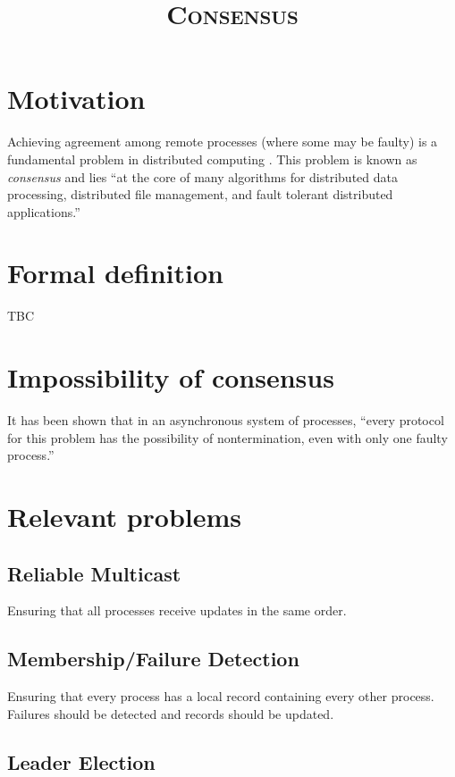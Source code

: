 \documentclass[12pt, a4paper]{article}
\title{\textsc{Consensus}}
\author{}
\date{}
\begin{document}
\maketitle


\section{Motivation}

Achieving agreement among remote processes (where some may be faulty) is a
fundamental problem in distributed computing \cite{fischer1985impossibility}.
This problem is known as \textit{consensus} and lies ``at the core of many
algorithms for distributed data processing, distributed file management, and
fault tolerant distributed applications.'' \cite{fischer1985impossibility}


\section{Formal definition}
TBC


\section{Impossibility of consensus}

It has been shown that in an asynchronous system of processes, ``every protocol
for this problem has the possibility of nontermination, even with only one
faulty process.'' \cite{fischer1985impossibility}


\section{Relevant problems}

\subsection{Reliable Multicast}

Ensuring that all processes receive updates in the same order.

\subsection{Membership/Failure Detection}

Ensuring that every process has a local record containing every other process.
Failures should be detected and records should be updated.

\subsection{Leader Election}
\end{document}

